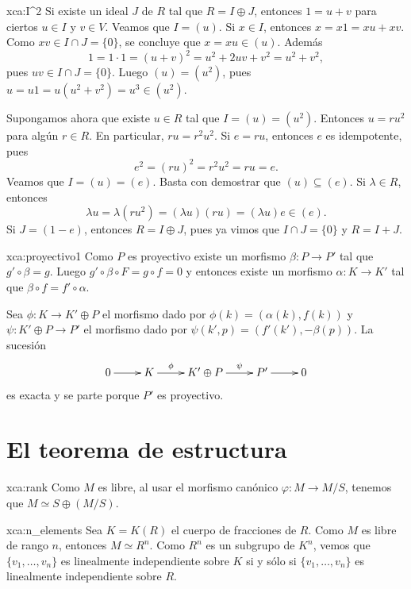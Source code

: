 \begin{sol}{xca:I^2}
Si existe un ideal $J$ de $R$ tal que $R=I\oplus J$, entonces $1=u+v$ para ciertos $u\in I$ y $v\in V$. Veamos que $I=(u)$. Si $x\in I$,
entonces $x=x1=xu+xv$. Como $xv\in I\cap J=\{0\}$, se concluye que $x=xu\in (u)$. Además 
\[
1=1\cdot 1=(u+v)^2=u^2+2uv+v^2=u^2+v^2,
\]
pues $uv\in I\cap J=\{0\}$. Luego $(u)=(u^2)$, pues $u=u1=u(u^2+v^2)=u^3\in (u^2)$.  

Supongamos ahora que existe $u\in R$ tal que $I=(u)=(u^2)$. Entonces $u=ru^2$ para algún $r\in R$. En particular, 
$ru=r^2u^2$. Si  
$e=ru$, entonces $e$ es idempotente, pues
\[
e^2=(ru)^2=r^2u^2=ru=e.
\]
Veamos que $I=(u)=(e)$. Basta con demostrar que $(u)\subseteq (e)$. 
Si $\lambda\in R$, entonces 
\[
\lambda u=\lambda(ru^2)=(\lambda u)(ru)=(\lambda u)e\in (e).
\]
Si $J=(1-e)$, entonces $R=I\oplus J$, pues ya vimos que
$I\cap J=\{0\}$ y $R=I+J$.  	
\end{sol}

\begin{sol}{xca:proyectivo1}
	Como $P$ es proyectivo existe un morfismo $\beta\colon P\to P'$ tal que $g'\circ \beta=g$.
	Luego $g'\circ \beta\circ F=g\circ f=0$ y entonces existe un morfismo $\alpha\colon K\to K'$
	tal que $\beta\circ f=f'\circ \alpha$. 

	Sea $\phi\colon K\to K'\oplus P$ el morfismo dado por
	$\phi(k)=(\alpha(k),f(k))$ y $\psi\colon K'\oplus P\to P'$ el morfismo dado
	por $\psi(k',p)=(f'(k'),-\beta(p))$. 
	La sucesión 
	\[
	\xymatrix{
	0\ar[r] 
	& K
	\ar[r]^-{\phi}
	& K'\oplus P
	\ar[r]^-{\psi}
	& P'\ar[r]
	& 0
	}
	\]
	es exacta y se parte porque $P'$ es proyectivo.
\end{sol}

\section*{El teorema de estructura}

\begin{sol}{xca:rank}
Como $M$ es libre, al usar el morfismo canónico $\varphi\colon M\to M/S$, tenemos que $M\simeq S\oplus (M/S)$.   
\end{sol}

\begin{sol}{xca:n_elements}
Sea $K=K(R)$ el cuerpo de fracciones de $R$. Como $M$ es libre de rango $n$, entonces $M\simeq R^n$. Como 
$R^n$ es un subgrupo de $K^n$, vemos que $\{v_1,\dots,v_n\}$ es linealmente independiente sobre $K$ si y sólo si $\{v_1,\dots,v_n\}$ 
es linealmente independiente sobre $R$.   
\end{sol}

